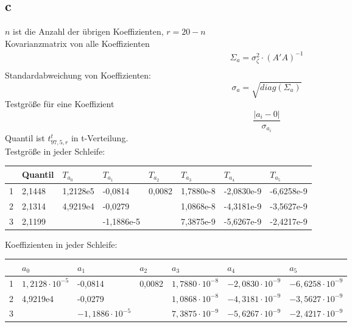 \subsection{c}
$n$ ist die Anzahl der übrigen Koeffizienten, $r = 20 - n$ \\
Kovarianzmatrix von alle Koeffizienten
\begin{gather*}
	\Sigma_{a} = \sigma_{\zeta}^2 \cdot (A'A)^{-1} \\
\end{gather*}
Standardabweichung von Koeffizienten:
\begin{equation*}
	\sigma_a = \sqrt{ diag(\Sigma_{a})}
\end{equation*}
Testgröße für eine Koeffizient
\begin{equation*}
	\frac{|a_i - 0|}{\sigma_{a_i}}
\end{equation*}
Quantil ist $t^t_{97,5,r}$ in t-Verteilung. \\
Testgröße in jeder Schleife: 
\begin{table}[ht] \centering
	\begin{tabular}{|l|l|l|l|l|l|l|l|}
		\hline
		& Quantil & $T_{a_0}$ & $T_{a_1}$  & $T_{a_2}$ & $T_{a_3}$ & $T_{a_4}$  & $T_{a_5}$  \\ \hline
		1 & 2,1448  & 1,2128e5  & -0,0814    & 0,0082    & 1,7880e-8 & -2,0830e-9 & -6,6258e-9 \\ \hline
		2 & 2,1314  & 4,9219e4  & -0,0279    &       & 1,0868e-8 & -4,3181e-9 & -3,5627e-9 \\ \hline
		3 & 2,1199  &       & -1,1886e-5 &      & 7,3875e-9 & -5,6267e-9 & -2,4217e-9 \\ \hline
	\end{tabular}
\end{table}
\newline
Koeffizienten in jeder Schleife:
\begin{table}[ht] \centering
	\begin{tabular}{|l|l|l|l|l|l|l|}
		\hline
		& $a_0$    & $a_1$      & $a_2$  & $a_3$     & $a_4$      & $a_5$      \\ \hline
		1 & $1,2128 \cdot 10^{-5}$ & -0,0814    & 0,0082 & $1,7880 \cdot 10^{-8}$ & $-2,0830 \cdot 10^{-9}$ & $-6,6258 \cdot 10^{-9}$ \\ \hline
		2 & 4,9219e4 & -0,0279    &     & $1,0868\cdot 10^{-8}$ & $-4,3181 \cdot 10^{-9}$ & $-3,5627 \cdot 10^{-9}$ \\ \hline
		3 &       & $-1,1886 \cdot 10^{-5}$ &     & $7,3875 \cdot 10^{-9}$ & $-5,6267 \cdot 10^{-9}$ & $-2,4217 \cdot 10^{-9}$ \\ \hline
	\end{tabular}
\end{table}
